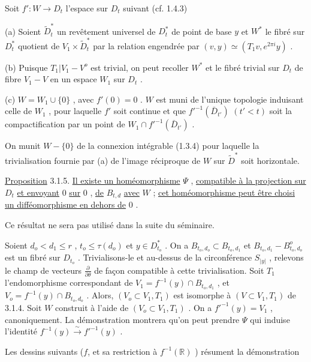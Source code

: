 Soit $f' : W \longrightarrow D_t$ l'espace sur $D_t$ suivant (cf. 1.4.3)

(a) Soient $\widetilde{D}_t^*$ un revêtement universel de $D_t^*$ de point de base $y$ et $W^*$ le fibré sur $D_t^*$ quotient de $V_1 \times \widetilde{D}_t^*$ par la relation engendrée par $(v, y) \simeq (T_1 v, e^{2\pi i} y)$ .

(b) Puisque $T_1 | V_1 - V^o$ est trivial, on peut recoller $W^*$ et le fibré trivial sur $D_t$ de fibre $V_1 - V$ en un espace $W_1$ sur $D_t$ .

(c) $W = W_1 \cup \{0\}$ , avec $f'(0) = 0$ . $W$ est muni de l'unique topologie induisant celle de $W_1$ , pour laquelle $f'$ soit continue et que ${f'}^{-1}(\bar{D}_{t'})$ $(t' < t)$ soit la compactification par un point de $W_1 \cap {f'}^{-1}(\bar{D}_{t'})$ .

On munit $W - \{0\}$ de la connexion intégrable (1.3.4) pour laquelle la trivialisation fournie par (a) de l'image réciproque de $W$ sur $\widetilde{D}^*$ soit horizontale.

\underline{Proposition} 3.1.5. \underline{Il existe un homéomorphisme} $\Psi$ , \underline{compatible à la projection sur} $D_t$ \underline{et envoyant} $0$ \underline{sur} $0$ , \underline{de} $B_{t,d}$ \underline{avec} $W$ ; \underline{cet homéomorphisme peut être choisi un difféomorphisme en dehors de} $0$ .

Ce résultat ne sera pas utilisé dans la suite du séminaire.

Soient $d_o < d_1 \leq r$ , $t_o \leq \tau(d_o)$ et $y \in D_{t_o}^*$ . On a $B_{t_o,d_o} \subset B_{t_o, d_1}$ et $B_{t_o,d_1} - B_{t_o,d_o}^o$ est un fibré sur $D_{t_o}$ . Trivialisons-le et au-dessus de la circonférence $S_{|y|}$ , relevons le champ de vecteurs $\frac{\partial}{\partial \theta}$ de façon compatible à cette trivialisation. Soit $T_1$ l'endomorphisme correspondant de $V_1 = f^{-1}(y) \cap B_{t_o,d_1}$ , et $V_o = f^{-1}(y) \cap B_{t_o,d_o}$ . Alors, $(V_o \subset V_1, T_1)$ est isomorphe à $(V \subset V_1, T_1)$ de 3.1.4. Soit $W$ construit à l'aide de $(V_o \subset V_1, T_1)$ . On a ${f'}^{-1}(y) = V_1$ , canoniquement. La démonstration montrera qu'on peut prendre $\Psi$ qui induise l'identité $f^{-1}(y) \xrightarrow{\sim} {f'}^{-1}(y)$ .

Les dessins suivants ($f$, et sa restriction à $f^{-1}(\mathbb{R})$ ) résument la démonstration



